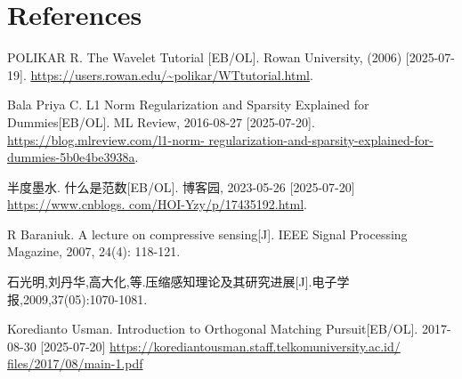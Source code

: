 \documentclass[12pt]{ctexart}
\begin{document}
\section*{\textbf{References}}
\begin{enumerate}[label={[\arabic*]}, leftmargin=0pt]
  \raggedright
  \item POLIKAR R. The Wavelet Tutorial [EB/OL]. Rowan University, (2006) [2025-07-19].
  \url{https://users.rowan.edu/~polikar/WTtutorial.html}.
  \item Bala Priya C. L1 Norm Regularization and Sparsity Explained for Dummies[EB/OL].
  ML Review, 2016-08-27 [2025-07-20]. \url{https://blog.mlreview.com/l1-norm-
  regularization-and-sparsity-explained-for-dummies-5b0e4be3938a}.
  \item 半度墨水. 什么是范数[EB/OL]. 博客园, 2023-05-26 [2025-07-20] \url{https://www.cnblogs.
  com/HOI-Yzy/p/17435192.html}.
  \item R Baraniuk. A lecture on compressive sensing[J]. IEEE Signal Processing Magazine,
  2007, 24(4): 118-121.
  \item 石光明,刘丹华,高大化,等.压缩感知理论及其研究进展[J].电子学报,2009,37(05):1070-1081.
  \item Koredianto Usman. Introduction to Orthogonal Matching Pursuit[EB/OL].
  2017-08-30 [2025-07-20] \url{https://korediantousman.staff.telkomuniversity.ac.id/
  files/2017/08/main-1.pdf}
\end{enumerate}
\end{document}
